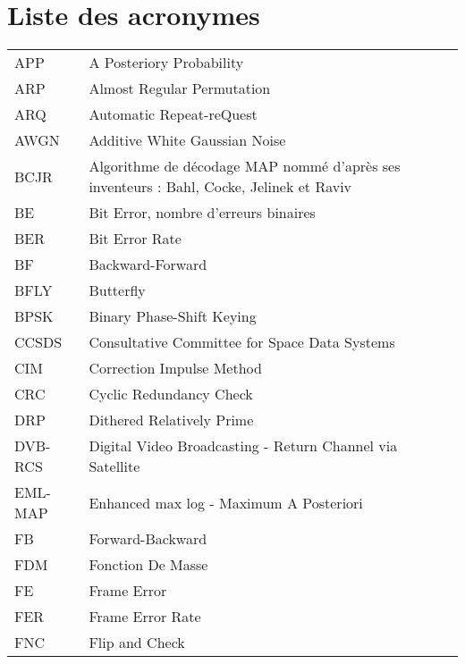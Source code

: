 \chapter*{Liste des acronymes}
\begin{center}

\begin{longtable}{ p{}  p{} } 

APP 		& 	A Posteriory Probability																			\\
ARP 		& 	Almost Regular Permutation 																			\\
ARQ 		& 	Automatic Repeat-reQuest	 																		\\
AWGN 		&   Additive White Gaussian Noise	 																	\\
BCJR 		&	Algorithme de décodage MAP nommé d'après ses inventeurs : Bahl, Cocke, Jelinek et Raviv				\\
BE 			& 	Bit Error, nombre d'erreurs binaires	 																\\
BER 		&   Bit Error Rate																						\\
BF 			&	Backward-Forward																					\\
BFLY 		&	Butterfly																							\\
BPSK 		&	Binary Phase-Shift Keying																			\\
CCSDS 		&   Consultative Committee for Space Data Systems														\\
CIM 		&  	Correction Impulse Method																			\\
CRC 		& 	Cyclic Redundancy Check 																			\\
DRP 		&   Dithered Relatively Prime																			\\
DVB-RCS 	&   Digital Video Broadcasting - Return Channel via Satellite	 										\\
EML-MAP 	&   Enhanced max log - Maximum A Posteriori																\\
FB 			&	Forward-Backward																					\\
FDM			&   Fonction De Masse																					\\
FE 			& 	Frame Error	 																						\\
FER 		&   Frame Error Rate																					\\
FNC 		&   Flip and Check																						\\

\end{longtable}
\end{center}
